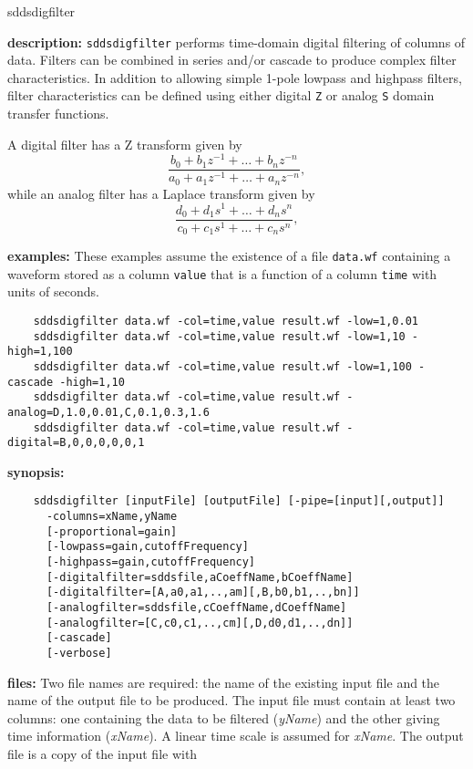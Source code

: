 \begin{sddsprog}{sddsdigfilter}
  \item \textbf{description:}
    \verb|sddsdigfilter| performs time-domain digital filtering of columns of data. Filters can be combined in series and/or
    cascade to produce complex filter characteristics. In addition to allowing simple 1-pole lowpass and highpass filters,
    filter characteristics can be defined using either digital \verb|Z| or analog \verb|S| domain transfer functions.

    A digital filter has a Z transform given by
    \[
    \frac{b_0 + b_1 z^{-1} + \ldots + b_n z^{-n}}{a_0 + a_1 z^{-1} + \ldots + a_n z^{-n}},
    \]
    while an analog filter has a Laplace transform given by
    \[
    \frac{d_0 + d_1 s^{1} + \ldots + d_n s^{n}}{c_0 + c_1 s^{1} + \ldots + c_n s^{n}},
    \]
  \item \textbf{examples:}
    These examples assume the existence of a file \verb|data.wf| containing a waveform stored as a column \verb|value| that is a
    function of a column \verb|time| with units of seconds.
    \begin{verbatim}
    sddsdigfilter data.wf -col=time,value result.wf -low=1,0.01
    sddsdigfilter data.wf -col=time,value result.wf -low=1,10 -high=1,100
    sddsdigfilter data.wf -col=time,value result.wf -low=1,100 -cascade -high=1,10
    sddsdigfilter data.wf -col=time,value result.wf -analog=D,1.0,0.01,C,0.1,0.3,1.6
    sddsdigfilter data.wf -col=time,value result.wf -digital=B,0,0,0,0,0,1
    \end{verbatim}
  \item \textbf{synopsis:}
    \begin{verbatim}
    sddsdigfilter [inputFile] [outputFile] [-pipe=[input][,output]]
      -columns=xName,yName
      [-proportional=gain]
      [-lowpass=gain,cutoffFrequency]
      [-highpass=gain,cutoffFrequency]
      [-digitalfilter=sddsfile,aCoeffName,bCoeffName]
      [-digitalfilter=[A,a0,a1,..,am][,B,b0,b1,..,bn]]
      [-analogfilter=sddsfile,cCoeffName,dCoeffName]
      [-analogfilter=[C,c0,c1,..,cm][,D,d0,d1,..,dn]]
      [-cascade]
      [-verbose]
    \end{verbatim}
  \item \textbf{files:}
    Two file names are required: the name of the existing input file and the name of the output file to be produced. The input
    file must contain at least two columns: one containing the data to be filtered ({\em yName}) and the other giving time
    information ({\em xName}). A linear time scale is assumed for {\em xName}. The output file is a copy of the input file with

\end{sddsprog}
